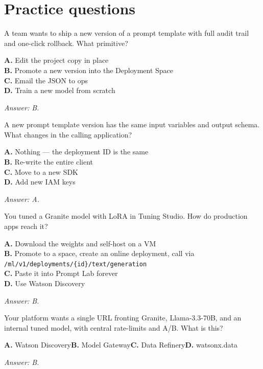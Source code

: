 \section{Practice questions}

\begin{practicebox}[title=\textbf{Q5.1 --- Lifecycle}]
A team wants to ship a new version of a prompt template with full audit trail and one-click rollback. What primitive?

\textbf{A.} Edit the project copy in place\\
\textbf{B.} Promote a new version into the Deployment Space\\
\textbf{C.} Email the JSON to ops\\
\textbf{D.} Train a new model from scratch

\vspace{0.2cm}\textit{Answer: B.}
\end{practicebox}

\begin{practicebox}[title=\textbf{Q5.2 --- App impact}]
A new prompt template version has the same input variables and output schema. What changes in the calling application?

\textbf{A.} Nothing --- the deployment ID is the same\\
\textbf{B.} Re-write the entire client\\
\textbf{C.} Move to a new SDK\\
\textbf{D.} Add new IAM keys

\vspace{0.2cm}\textit{Answer: A.}
\end{practicebox}

\begin{practicebox}[title=\textbf{Q5.3 --- Custom model}]
You tuned a Granite model with LoRA in Tuning Studio. How do production apps reach it?

\textbf{A.} Download the weights and self-host on a VM\\
\textbf{B.} Promote to a space, create an online deployment, call via \texttt{/ml/v1/deployments/\{id\}/text/generation}\\
\textbf{C.} Paste it into Prompt Lab forever\\
\textbf{D.} Use Watson Discovery

\vspace{0.2cm}\textit{Answer: B.}
\end{practicebox}

\begin{practicebox}[title=\textbf{Q5.4 --- Model Gateway}]
Your platform wants a single URL fronting Granite, Llama-3.3-70B, and an internal tuned model, with central rate-limits and A/B. What is this?

\textbf{A.} Watson Discovery\hspace{1em}\textbf{B.} Model Gateway\hspace{1em}\textbf{C.} Data Refinery\hspace{1em}\textbf{D.} watsonx.data

\vspace{0.2cm}\textit{Answer: B.}
\end{practicebox}

